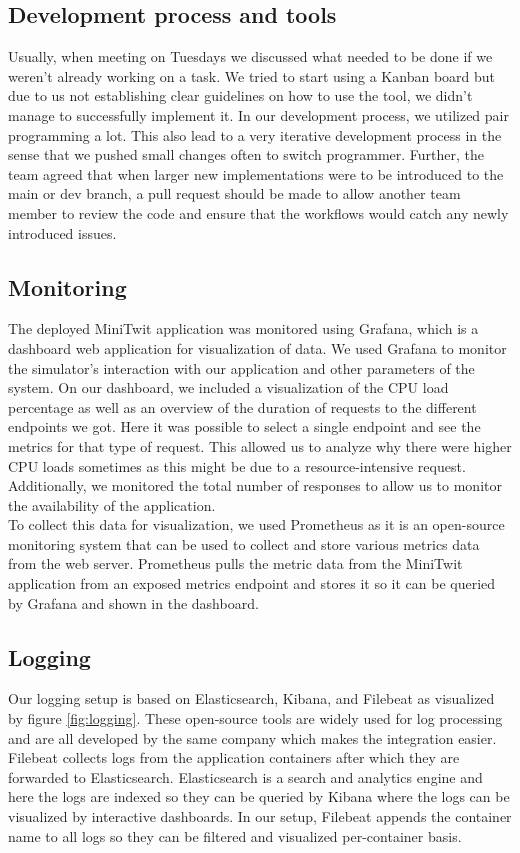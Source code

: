 \subsection{Development process and tools}
Usually, when meeting on Tuesdays we discussed what needed to be done if we weren't already working on a task. We tried to start using a Kanban board but due to us not establishing 
clear guidelines on how to use the tool, we didn't manage to successfully implement it. In our development process, we utilized pair programming a lot. This also lead to a very iterative development 
process in the sense that we pushed small changes often to switch programmer. Further, the team agreed that when larger new implementations were to be introduced
to the main or dev branch, a pull request should be made to allow another team member to review the code and ensure that the workflows would catch any newly
introduced issues. 

\subsection{Monitoring}
The deployed MiniTwit application was monitored using Grafana, which is a dashboard web application for visualization of data. 
We used Grafana to monitor the simulator's interaction with our application and other parameters of the system. On our dashboard, 
we included a visualization of the CPU load percentage as well as an overview of the duration of requests to the different endpoints  
we got. Here it was possible to select a single endpoint and see the metrics for that type of request. This allowed us to analyze why 
there were higher CPU loads sometimes as this might be due to a resource-intensive request. Additionally, we monitored the total number of
responses to allow us to monitor the availability of the application. \\

To collect this data for visualization, we used Prometheus as it is an open-source monitoring system that can be used to collect 
and store various metrics data from the web server. Prometheus pulls the metric data from the MiniTwit application from an exposed metrics endpoint
and stores it so it can be queried by Grafana and shown in the dashboard.  

\subsection{Logging}
Our logging setup is based on Elasticsearch, Kibana, and Filebeat as visualized by figure \ref{fig:logging}. 
These open-source tools are widely used for log processing and are all developed by the same company which makes the integration easier. 
Filebeat collects logs from the application containers after which they are forwarded to Elasticsearch. 
Elasticsearch is a search and analytics engine and here the logs are indexed so they can be queried by Kibana where the logs can be visualized by interactive dashboards.  
In our setup, Filebeat appends the container name to all logs so they can be filtered and visualized per-container basis.

